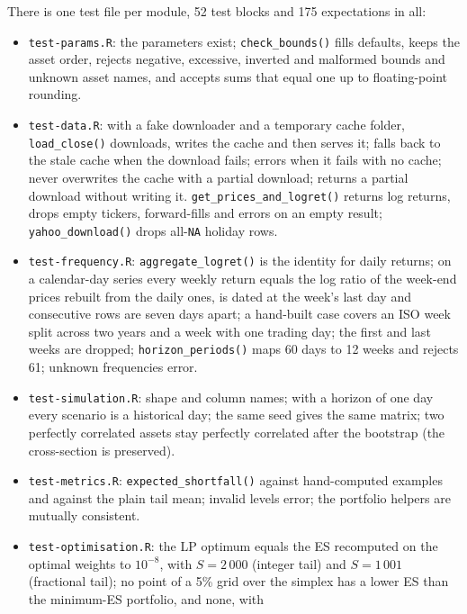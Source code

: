 \documentclass[11pt,a4paper]{article}
\newcommand{\code}[1]{\texttt{#1}}
\newcommand{\file}[1]{\texttt{#1}}
\theoremstyle{plain}
\theoremstyle{remark}
\begin{document}
There is one test file per module, 52 test blocks and 175 expectations in
all:
\begin{itemize}[nosep]
  \item \file{test-params.R}: the parameters exist; \code{check\_bounds()}
        fills defaults, keeps the asset order, rejects negative, excessive,
        inverted and malformed bounds and unknown asset names, and accepts
        sums that equal one up to floating-point rounding.
  \item \file{test-data.R}: with a fake downloader and a temporary cache
        folder, \code{load\_close()} downloads, writes the cache and then
        serves it; falls back to the stale cache when the download fails;
        errors when it fails with no cache; never overwrites the cache with a
        partial download; returns a partial download without writing it.
        \code{get\_prices\_and\_logret()} returns log returns, drops empty
        tickers, forward-fills and errors on an empty result;
        \code{yahoo\_download()} drops all-\code{NA} holiday rows.
  \item \file{test-frequency.R}: \code{aggregate\_logret()} is the identity
        for daily returns; on a calendar-day series every weekly return
        equals the log ratio of the week-end prices rebuilt from the daily
        ones, is dated at the week's last day and consecutive rows are seven
        days apart; a hand-built case covers an ISO week split across two
        years and a week with one trading day; the first and last weeks are
        dropped; \code{horizon\_periods()} maps 60 days to 12 weeks and
        rejects 61; unknown frequencies error.
  \item \file{test-simulation.R}: shape and column names; with a horizon
        of one day every scenario is a historical day; the same seed gives
        the same matrix; two perfectly correlated assets stay perfectly
        correlated after the bootstrap (the cross-section is preserved).
  \item \file{test-metrics.R}: \code{expected\_shortfall()} against
        hand-computed examples and against the plain tail mean; invalid
        levels error; the portfolio helpers are mutually consistent.
  \item \file{test-optimisation.R}: the LP optimum equals the ES recomputed
        on the optimal weights to $10^{-8}$, with $S = 2\,000$ (integer tail)
        and $S = 1\,001$ (fractional tail); no point of a 5\% grid over the
        simplex has a lower ES than the minimum-ES portfolio, and none, with

\end{itemize}
\end{document}
